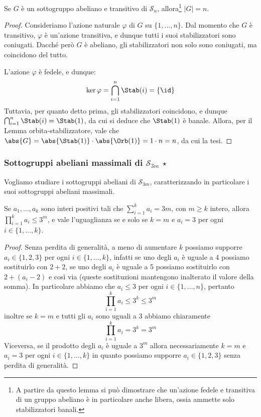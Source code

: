 \documentclass[11pt]{scrartcl}
\begin{document}
	\begin{lemma}
		\label{lemma1.54}
		Se $G$ è un sottogruppo abeliano e transitivo di $\mathcal{S}_n$,
		allora\footnote{
			A partire da questo lemma si può dimostrare che un'azione fedele e
			transitiva di un gruppo abeliano è in particolare anche libera, ossia
			ammette solo stabilizzatori banali.
		} $\lvert G \rvert = n$.
	\end{lemma}
	
	\begin{proof}
		Consideriamo l'azione naturale $\varphi$ di $G$ su $\{1, \ldots, n\}$. Dal momento
		che $G$ è transitivo, $\varphi$ è un'azione transitiva, e dunque tutti i suoi
		stabilizzatori sono coniugati. Dacché però $G$ è abeliano, gli stabilizzatori
		non solo sono coniugati, ma coincidono del tutto. \medskip
		
		
		L'azione $\varphi$ è fedele, e dunque:
		\[
		\ker \varphi = \bigcap_{i=1}^{n} \Stab(i) = \{\id\}
		\]
		Tuttavia, per quanto detto prima, gli stabilizzatori coincidono, e dunque
		$\bigcap_{i=1}^{n} \Stab(i) = \Stab(1)$, da cui si deduce che $\Stab(1)$ è
		banale. Allora, per il Lemma orbita-stabilizzatore, vale che
		$\abs{G} = \abs{\Stab(1)} \cdot \abs{\Orb(1)} = 1 \cdot n = n$, da cui la tesi.
	\end{proof}
	
	\subsubsection{Sottogruppi abeliani massimali di \texorpdfstring{$\mathcal{S}_{3m}$}{S₃ₘ} \texorpdfstring{$\star$}{★}}
	
	Vogliamo studiare i sottogruppi abeliani di $\mathcal{S}_{3m}$, caratterizzando in particolare
	i suoi sottogruppi abeliani massimali.
	
	\begin{lemma}
		\label{lemma1.55}
		Se $a_1, \ldots, a_k$ sono interi positivi tali che $\displaystyle
		\sum_{i = 1}^k a_i = 3m$,
		con $m \geqslant k$ intero, allora $\displaystyle
		\prod_{i = 1}^k a_i \leq 3^m$, 
		e vale l'uguaglianza se e solo se $k = m$ e $a_i = 3$ per ogni $i \in \{1, \ldots, k\}$.
	\end{lemma}
	
	\begin{proof}
		Senza perdita di generalità, a meno di aumentare $k$ possiamo supporre
		$a_i \in \{1, 2, 3\}$ per ogni $i \in \{1, \ldots, k\}$, infatti se 
		uno degli $a_i$ è uguale a 4 possiamo sostituirlo con $2 + 2$, se uno degli
		$a_i$ è uguale a 5 possiamo sostituirlo con $2 + (a_i - 2)$ e così via
		(queste sostituzioni mantengono inalterato il valore della somma).
		In particolare abbiamo che $a_i \leqslant 3$ per ogni $i \in \{1, \ldots, n\}$,
		pertanto 
		\[
		\prod_{i = 1}^k a_i \leq 3^k \leq 3^m
		\]
		inoltre se $k = m$ e tutti gli $a_i$ sono uguali a 3 abbiamo chiaramente
		\[
		\prod_{i = 1}^k a_i = 3^k = 3^m
		\]
		Viceversa, se il prodotto degli $a_i$ è uguale a $3^m$ allora necessariamente
		$k = m$ e $a_i = 3$ per ogni $i \in \{1, \ldots, k\}$ in quanto possiamo
		supporre $a_i \in \{1, 2, 3\}$ senza perdita di generalità.
	\end{proof}
	
\end{document}
